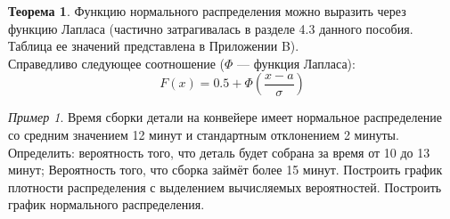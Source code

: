 \documentclass[12pt,a4paper]{article}
\theoremstyle{definition}
\theoremstyle{definition}
\newtheorem{theorem}{Теорема}[section]
\theoremstyle{remark}
\theoremstyle{corollary}
\theoremstyle{bolditalic}
\newtheorem{example}{Пример}[section]
\begin{document}
\begin{theorem}
    Функцию нормального распределения можно выразить через функцию Лапласа (частично затрагивалась в разделе 4.3 данного пособия. Таблица ее значений представлена в Приложении B).\\

Справедливо следующее соотношение ($\Phi$ --- функция Лапласа):
\[
F(x)=0.5 + \Phi\left(\frac{x-a}{\sigma}\right)
\]
\end{theorem}


\begin{example}
Время сборки детали на конвейере имеет нормальное распределение со средним значением 12 минут и стандартным отклонением 2 минуты. Определить: вероятность того, что деталь будет собрана за время от 10 до 13 минут; Вероятность того, что сборка займёт более 15 минут. Построить график плотности распределения с выделением вычисляемых вероятностей. Построить график нормального распределения.
\end{example}
\end{document}
